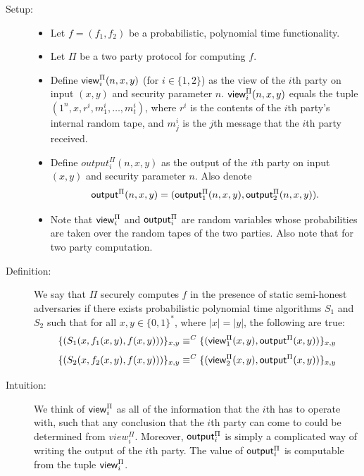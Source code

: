 
\begin{description}
\item [Setup:] \hfill
    \begin{itemize}
        \item Let $f = (f_1, f_2)$ be a probabilistic, polynomial time functionality. 

        \item Let $\Pi$ be a two party protocol for computing $f$. 

        \item Define ${\sf view}_i^{\Pi}(n,x,y)$ (for $i \in \{1,2\}$) as the view of the $i$th party on input $(x,y)$ and security parameter $n$.
        ${\sf view}_i^{\Pi}(n,x,y)$ equals the tuple $(1^n, x, r^i, m_1^i, \ldots, m_t^i)$, where $r^i$ is the contents of the $i$th party's internal random tape, and $m_j^i$ is the $j$th message that the $i$th party received.
    
        \item Define $output^{\Pi}_i(n,x,y)$ as the output of the $i$th party on input $(x,y)$ and security parameter $n$.
        Also denote
        $$ {\sf output}^{\Pi}(n,x,y) = ({\sf output}^{\Pi}_1(n,x,y), {\sf output}^{\Pi}_2(n,x,y)).$$

    \item Note that ${\sf view}^{\Pi}_i$ and ${\sf output}^{\Pi}_i$ are random variables whose probabilities are taken over the random tapes of the two parties. Also note that for two party computation.
\end{itemize}
\item [Definition:]
We say that $\Pi$ securely computes $f$ in the presence of static semi-honest adversaries if there exists probabilistic polynomial time algorithms $S_1$ and $S_2$ such that for all $x,y \in \{0,1\}^*$, where $|x| = |y|$, the following are true:
\begin{equation} 
    \label{eqn:secdef1}
    \{(S_1(x, f_1(x,y), f(x,y)))\}_{x,y} \equiv^C \{({\sf view}^{\Pi}_1(x,y), {\sf output}^{\Pi}(x,y)) \}_{x,y} 
\end{equation}
\begin{equation} 
    \label{eqn:secdef2}
    \{(S_2(x, f_2(x,y), f(x,y)))\}_{x,y} \equiv^C \{({\sf view}^{\Pi}_2(x,y), {\sf output}^{\Pi}(x,y)) \}_{x,y} 
\end{equation}

\item[Intuition:]
    We think of ${\sf view}^{\Pi}_i$ as all of the information that the $i$th has to operate with, such that any conclusion that the $i$th party can come to could be determined from $view^{\Pi}_i$.
    Moreover, ${\sf output}^{\Pi}_i$ is simply a complicated way of writing the output of the $i$th party. 
    The value of ${\sf output}^{\Pi}_i$ is computable from the tuple ${\sf view}^{\Pi}_i$.


\end{description}
